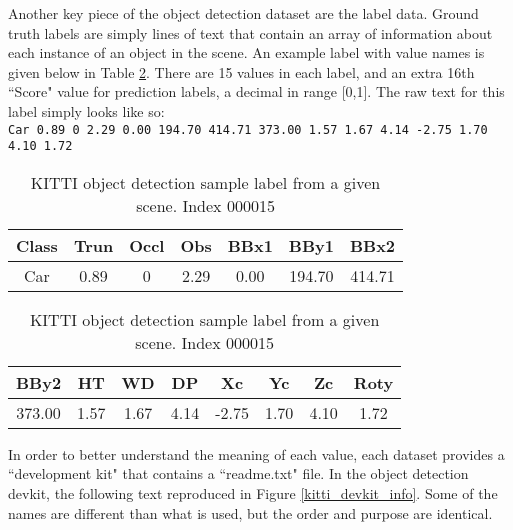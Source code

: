 Another key piece of the object detection dataset are the label data. Ground truth labels are simply lines of text that contain an array of information about each instance of an object in the scene. An example label with value names is given below in Table \ref{kitti_label_sample}. There are 15 values in each label, and an extra 16th ``Score" value for prediction labels, a decimal in range [0,1]. The raw text for this label simply looks like so: \\
\texttt{Car 0.89 0 2.29 0.00 194.70 414.71 373.00 1.57 1.67 4.14 -2.75 1.70 4.10 1.72} \\


\begin{table}[ht]
\centering
\caption{KITTI object detection sample label from a given scene. Index 000015}
\begin{tabular}{|c|c|c|c|c|c|c|}
\hline
Class & Trun & Occl & Obs  & BBx1  & BBy1   & BBx2  \\
\hline
Car   & 0.89       & 0         & 2.29 & 0.00  & 194.70 & 414.71 \\
\hline
\end{tabular}
\begin{tabular}{|c|c|c|c|c|c|c|c|}
\hline
BBy2   & HT   & WD   & DP   & Xc    & Yc   & Zc   & Roty \\
\hline
373.00 & 1.57 & 1.67 & 4.14 & -2.75 & 1.70 & 4.10 & 1.72 \\
\hline
\end{tabular}
\label{kitti_label_sample}
\end{table}

In order to better understand the meaning of each value, each dataset provides a ``development kit" that contains a ``readme.txt" file. In the object detection devkit, the following text reproduced in Figure \ref{kitti_devkit_info}. Some of the names are different than what is used, but the order and purpose are identical.


